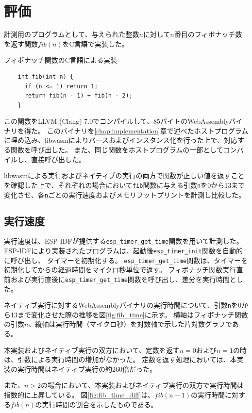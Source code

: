 \chapter{評価}
\label{chap:evaluation}

計測用のプログラムとして、与えられた整数$n$に対して$n$番目のフィボナッチ数を返す関数$fib(n)$をC言語で実装した。

\begin{itembox}[l]{フィボナッチ関数のC言語による実装}
  \begin{verbatim}
    int fib(int n) {
      if (n <= 1) return 1;
      return fib(n - 1) + fib(n - 2);
    }
  \end{verbatim}
\end{itembox}

この関数をLLVM (Clang) 7.0でコンパイルして、85バイトのWebAssemblyバイナリを得た。
このバイナリを\ref{chap:implementation}章で述べたホストプログラムに埋め込み、libwasmによりパースおよびインスタンス化を行った上で、対応する関数を呼び出した。
また、同じ関数をホストプログラムの一部としてコンパイルし、直接呼び出した。

libwasmによる実行およびネイティブの実行の両方で関数が正しい値を返すことを確認した上で、それぞれの場合において\verb|fib|関数に与える引数\verb|n|を0から13まで変化させ、各\verb|n|ごとの実行速度およびメモリフットプリントを計測し比較した。

\section{実行速度}

実行速度は、ESP-IDFが提供する\verb|esp_timer_get_time|関数を用いて計測した。
ESP-IDFにより実装されたプログラムは、起動後\verb|esp_timer_init|関数を自動的に呼び出し、
タイマーを初期化する。
\verb|esp_timer_get_time|関数は、タイマーを初期化してからの経過時間をマイクロ秒単位で返す。
フィボナッチ関数実行直前および実行直後に\verb|esp_timer_get_time|関数を呼び出し、差分を実行時間とした。

ネイティブ実行に対するWebAssemblyバイナリの実行時間について、引数\verb|n|を0から13まで変化させた際の推移を図\ref{fig:fib_time}に示す。
横軸はフィボナッチ関数の引数$n$、縦軸は実行時間（マイクロ秒）を対数軸で示した片対数グラフである。

本実装およびネイティブ実行の双方において、定数を返す$n=0$および$n=1$の時は、引数による実行時間の増加がなかった。
定数を返す処理においては、本実装の実行時間はネイティブ実行の約260倍だった。

また、$n>2$の場合において、本実装およびネイティブ実行の双方で実行時間は指数的に上昇している。
図\ref{fig:fib_time_diff}は、$fib(n-1)$の実行時間に対する$fib(n)$の実行時間の割合を示したものである。

